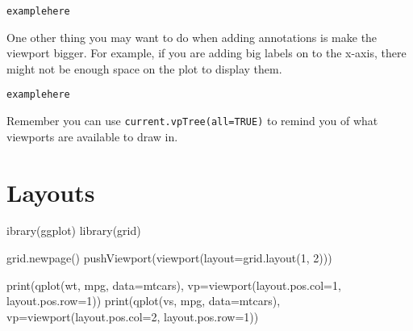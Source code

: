 \begin{alltt}
example here
\end{alltt}

One other thing you may want to do when adding annotations is make the viewport bigger.  For example, if you are adding big labels on to the x-axis, there might not be enough space on the plot to display them.  

\begin{alltt}
example here
\end{alltt}

Remember you can use {\tt current.vpTree(all=TRUE)} to remind you of what viewports are available to draw in.

\section{Layouts}\label{sec:layouts} %

ibrary(ggplot)
library(grid)

grid.newpage()
pushViewport(viewport(layout=grid.layout(1, 2)))

print(qplot(wt, mpg, data=mtcars), vp=viewport(layout.pos.col=1, layout.pos.row=1))
print(qplot(vs, mpg, data=mtcars), vp=viewport(layout.pos.col=2, layout.pos.row=1))




